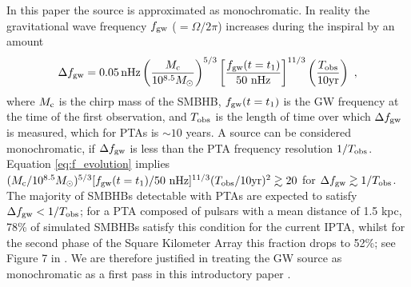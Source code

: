 \documentclass[fleqn,usenatbib,useAMS]{mnras}
\begin{document}
In this paper the source is approximated as monochromatic. In reality the gravitational wave frequency $f_{\rm gw}$ ($=\Omega / 2 \pi $) increases during the inspiral by an amount \citep[e.g.][]{Sesana2010}
\begin{equation}
	\Delta f_{\rm gw} = 0.05 \, \mathrm{nHz}\left(\frac{M_{\rm c}}{10^{8.5} M_{\odot}}\right)^{5 / 3}\left[\frac{f_{\rm gw}(t=t_1)}{50 \mathrm{~nHz}}\right]^{11 / 3}\left(\frac{T_{\mathrm{obs}}}{10 \mathrm{yr}}\right) \ ,
	\label{eq:f_evolution}
\end{equation}
%
where $M_{\rm c}$ is the chirp mass of the SMBHB, $f_{\rm gw}(t=t_1)$ is the GW frequency at the time of the first observation, and $T_{\rm obs}$ is the length of time over which $\Delta f_{\rm gw}$ is measured, which for PTAs is $\sim 10$ years. A source can be considered monochromatic, if $\Delta f_{\rm gw}$ is less than the PTA frequency resolution $1/T_{\rm obs}$. Equation \eqref{eq:f_evolution} implies $(M_{\rm c}/10^{8.5} M_{\odot})^{5/3} [ f_{\rm gw}(t=t_1) / 50 \mathrm{~nHz}]^{11/3} (T_{\rm obs}/10 \mathrm{yr})^2 \gtrsim 20$ for $\Delta f_{\rm gw} \gtrsim 1/T_{\rm obs}$. The majority of SMBHBs detectable with PTAs are expected to satisfy $\Delta f_{\rm gw} < 1/T_{\rm obs}$; for a PTA composed of pulsars with a mean distance of 1.5 kpc, 78\% of simulated SMBHBs satisfy this condition for the current IPTA, whilst for the second phase of the Square Kilometer Array this fraction drops to 52\%; see Figure 7 in  \cite{Rosado10.1093/mnras/stv1098}. We are therefore justified in treating the GW source as monochromatic as a first pass in this introductory paper \citep{Sesana10,Sesana2010,Ellis2012ApJ}. \newline 
\end{document}

